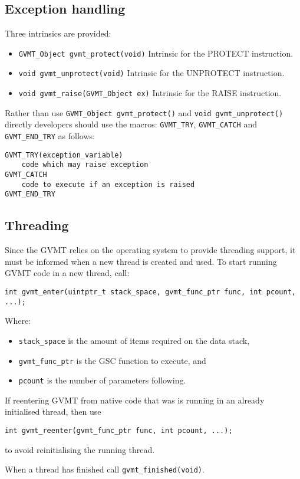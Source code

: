 \subsection{Exception handling\label{sect:user-except}}
Three intrinsics are provided:
\begin{itemize}
\item \verb|GVMT_Object gvmt_protect(void)| Intrinsic for the PROTECT instruction.
\item \verb|void gvmt_unprotect(void)| Intrinsic for the UNPROTECT instruction.
\item \verb|void gvmt_raise(GVMT_Object ex)| Intrinsic for the RAISE instruction.
\end{itemize}

Rather than use \verb|GVMT_Object gvmt_protect()| and \verb|void gvmt_unprotect()| directly developers should use the macros: 
\verb|GVMT_TRY|, \verb|GVMT_CATCH| and \verb|GVMT_END_TRY| as follows:
\begin{verbatim}
GVMT_TRY(exception_variable)
    code which may raise exception
GVMT_CATCH
    code to execute if an exception is raised
GVMT_END_TRY
\end{verbatim}

\subsection{Threading\label{sect:user-threads}}
Since the GVMT relies on the operating system to provide threading support, it must be informed when a new thread is created and used.
To start running GVMT code in a new thread, call:
\begin{verbatim}
int gvmt_enter(uintptr_t stack_space, gvmt_func_ptr func, int pcount, ...);
\end{verbatim}
Where:
\begin{itemize}
\item \verb|stack_space| is the amount of items required on the data stack,
\item \verb|gvmt_func_ptr| is the GSC function to execute, and
\item \verb|pcount| is the number of parameters following.
\end{itemize}

If reentering GVMT from native code that was is running in an already initialised thread, then use 
\begin{verbatim}
int gvmt_reenter(gvmt_func_ptr func, int pcount, ...);
\end{verbatim}
to avoid reinitialising the running thread.

When a thread has finished call \verb|gvmt_finished(void)|.